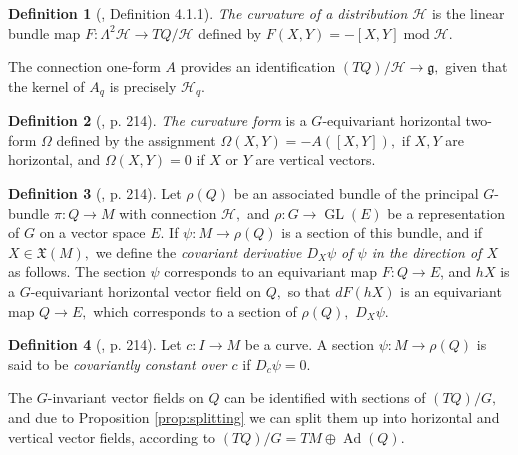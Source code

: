 \documentclass[12pt, letterpaper, reqno]{amsart}
\theoremstyle{definition}
\newtheorem{df}{Definition}
\theoremstyle{plain}
\theoremstyle{remark}
\providecommand{\DIFaddbegin}{} %
\providecommand{\DIFaddend}{} %
\providecommand{\DIFdelbegin}{} %
\providecommand{\DIFdelend}{} %
\newcommand{\DIFscaledelfig}{0.5}
\newlength{\DIFdelgraphicswidth} %
\newlength{\DIFdelgraphicsheight} %
\newcommand{\DIFaddincludegraphics}[2][]{{\color{blue}\fbox{\DIFOincludegraphics[#1]{#2}}}} %
\newcommand{\DIFdelincludegraphics}[2][]{%
\sbox{\DIFdelgraphicsbox}{\DIFOincludegraphics[#1]{#2}}%
\settoboxwidth{\DIFdelgraphicswidth}{\DIFdelgraphicsbox} %
\settoboxtotalheight{\DIFdelgraphicsheight}{\DIFdelgraphicsbox} %
\scalebox{\DIFscaledelfig}{%
\parbox[b]{\DIFdelgraphicswidth}{\usebox{\DIFdelgraphicsbox}\\[-\baselineskip] \rule{\DIFdelgraphicswidth}{0em}}\llap{\resizebox{\DIFdelgraphicswidth}{\DIFdelgraphicsheight}{%
\setlength{\unitlength}{\DIFdelgraphicswidth}%
\begin{picture}(1,1)%
\thicklines\linethickness{2pt} %
{\color[rgb]{1,0,0}\put(0,0){\framebox(1,1){}}}%
{\color[rgb]{1,0,0}\put(0,0){\line( 1,1){1}}}%
{\color[rgb]{1,0,0}\put(0,1){\line(1,-1){1}}}%
\end{picture}%
}\hspace*{3pt}}} %
} %
\DeclareRobustCommand{\DIFaddbegin}{\DIFOaddbegin \let\includegraphics\DIFaddincludegraphics} %
\DeclareRobustCommand{\DIFaddend}{\DIFOaddend \let\includegraphics\DIFOincludegraphics} %
\DeclareRobustCommand{\DIFdelbegin}{\DIFOdelbegin \let\includegraphics\DIFdelincludegraphics} %
\DeclareRobustCommand{\DIFdelend}{\DIFOaddend \let\includegraphics\DIFOincludegraphics} %
\begin{document}
\DIFdelbegin %
\DIFdelend \DIFaddbegin \begin{df}[\cite{montgomery2002tour}, Definition 4.1.1]
	\DIFaddend \textit{The curvature of a distribution $ \mathcal{H} $ } is the linear bundle map $ F: \Lambda^2 \mathcal{H} \rightarrow TQ/\mathcal{H} $ defined by $ F(X,Y) = -[X,Y] \operatorname{mod} \mathcal{H}.  $ 	
\end{df}
The connection one-form $ A $ provides an identification $ (TQ)/ \mathcal{H} \rightarrow \mathfrak{g}, $ given that the kernel of $ A_q $ is precisely $ \mathcal{H}_q. $ 

\begin{df}[\cite{montgomery2002tour}, p. 214]\DIFaddbegin \label{df:curvature_form}
	\DIFaddend \textit{The curvature form} is a $ G $-equivariant horizontal two-form $ \Omega $ defined by the assignment $ \Omega(X,Y) = -A([X,Y]), $ if $ X,Y $ are horizontal, and $ \Omega(X,Y)=0 $ if $ X $ or $ Y$ are vertical vectors.  
\end{df}

\begin{df}[\cite{montgomery2002tour}, p. 214]
	Let $ \rho(Q) $ be an associated bundle of the principal $ G $-bundle $ \pi: Q \rightarrow M $ with connection $ \mathcal{H}, $  and $ \rho:  G \rightarrow \operatorname{GL}(E) $ be a representation of $ G $ on a vector space $ E. $  If $ \psi: M \rightarrow \rho(Q) $ is a section of this bundle, and if $ X\in \mathfrak{X}(M), $ we define the \textit{covariant derivative $ D_X\psi $ of $ \psi $ in the direction of $ X $} as follows. The section $ \psi $ corresponds to an equivariant map $ F: Q \rightarrow E $, and $ hX $ is a $ G $-equivariant horizontal vector field on $ Q, $ so that $ dF(hX) $ is an equivariant map $ Q \rightarrow E, $ which corresponds to a section of $ \rho(Q), $ $ D_X\psi. $ 
\end{df}
\begin{df}[\cite{montgomery2002tour}, p. 214]\label{df:covariantly_constant}
	Let $ c:I \rightarrow M $ be a curve. A section $ \psi: M\rightarrow \rho(Q) $ is said to be \textit{covariantly constant over $ c $} if $ D_{\dot{c}}\psi=0. $  	
\end{df}
The $ G $-invariant vector fields on $ Q $ can be identified with sections of $ (TQ)/G, $ and due to Proposition \ref{prop:splitting} we can split them up into horizontal and vertical vector fields, according to $ (TQ)/G = TM \oplus \operatorname{Ad} (Q). $ 
\end{document}
